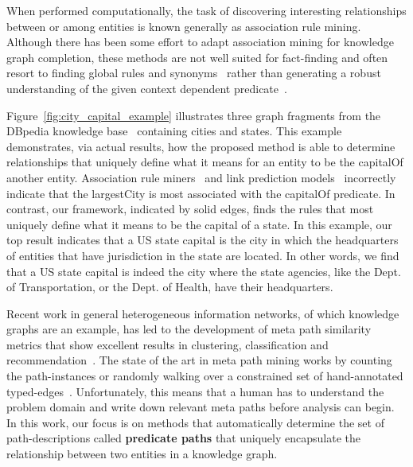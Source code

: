 \documentclass[reprint,twocolumn,showpacs,preprintnumbers,amsmath, aps,pre,amssymb]{revtex4-1}
\begin{document}
When performed computationally, the task of discovering interesting relationships between or among entities is known generally as association rule mining. Although there has been some effort to adapt association mining for knowledge graph completion, these methods are not well suited for fact-finding and often resort to finding global rules and synonyms~\cite{Abedjan2013,Galarraga2013} rather than generating a robust understanding of the given context dependent predicate~\cite{Meng2015}.


Figure~\ref{fig:city_capital_example} illustrates three graph fragments from the DBpedia knowledge base~\cite{Lehmann2014} containing cities and states. This example demonstrates, via actual results, how the proposed method is able to determine relationships that uniquely define what it means for an entity to be the \textsf{capitalOf} another entity. Association rule miners~\cite{Galarraga2013} and link prediction models~\cite{Barabasi1999,Katz1953} incorrectly indicate that the \textsf{largestCity} is most associated with the \textsf{capitalOf} predicate. In contrast, our framework, indicated by solid edges, finds the rules that most uniquely define what it means to be the \textsf{capital} of a state. In this example, our top result indicates that a US state capital is the \textsf{city} in which the \textsf{headquarters} of entities that have \textsf{jurisdiction} in the \textsf{state} are located. In other words, we find that a US state capital is indeed the city where the state agencies, like the Dept. of Transportation, or the Dept. of Health, have their headquarters. 

Recent work in general heterogeneous information networks, of which knowledge graphs are an example, has led to the development of meta path similarity metrics that show excellent results in clustering, classification and recommendation~\cite{Sun2012, Lao2010, Shi2014, Sun2011}. The state of the art in meta path mining works by counting the path-instances or randomly walking over a constrained set of hand-annotated typed-edges~\cite{Sun2011}. Unfortunately, this means that a human has to understand the problem domain and write down relevant meta paths before analysis can begin. In this work, our focus is on methods that automatically determine the set of path-descriptions called \textbf{predicate paths} that uniquely encapsulate the relationship between two entities in a knowledge graph.
\end{document}
